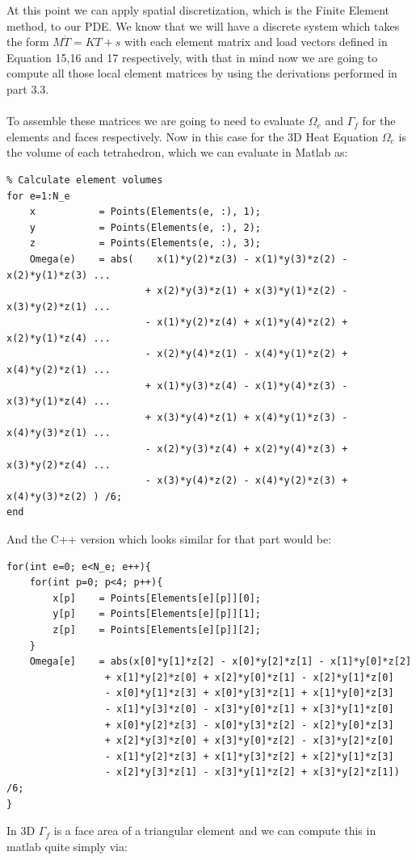 \documentclass[12pt]{article}
\begin{document}
At this point we can apply spatial discretization, which is the Finite Element method, to our PDE. We know that we will have a discrete system which takes the form $M\dot{T} = KT + s$ with each element matrix and load vectors defined in Equation 15,16 and 17 respectively, with that in mind now we are going to compute all those local element matrices by using the derivations performed in part 3.3.
\\\\
To assemble these matrices we are going to need to evaluate $\Omega_e$ and $\Gamma_f$ for the elements and faces respectively. Now in this case for the 3D Heat Equation $\Omega_e$ is the volume of each tetrahedron, which we can evaluate in Matlab as:

\begin{lstlisting}
% Calculate element volumes
for e=1:N_e	
	x           = Points(Elements(e, :), 1);
	y           = Points(Elements(e, :), 2);
	z           = Points(Elements(e, :), 3);
	Omega(e)	= abs(    x(1)*y(2)*z(3) - x(1)*y(3)*z(2) - x(2)*y(1)*z(3) ...
						+ x(2)*y(3)*z(1) + x(3)*y(1)*z(2) - x(3)*y(2)*z(1) ...
						- x(1)*y(2)*z(4) + x(1)*y(4)*z(2) + x(2)*y(1)*z(4) ...
						- x(2)*y(4)*z(1) - x(4)*y(1)*z(2) + x(4)*y(2)*z(1) ...
						+ x(1)*y(3)*z(4) - x(1)*y(4)*z(3) - x(3)*y(1)*z(4) ...
						+ x(3)*y(4)*z(1) + x(4)*y(1)*z(3) - x(4)*y(3)*z(1) ...
						- x(2)*y(3)*z(4) + x(2)*y(4)*z(3) + x(3)*y(2)*z(4) ...
						- x(3)*y(4)*z(2) - x(4)*y(2)*z(3) + x(4)*y(3)*z(2) ) /6;
end
\end{lstlisting}

And the C++ version which looks similar for that part would be:

\begin{lstlisting}[style=MyC++Style]
for(int e=0; e<N_e; e++){
	for(int p=0; p<4; p++){
		x[p]	= Points[Elements[e][p]][0];
		y[p]	= Points[Elements[e][p]][1];
		z[p]	= Points[Elements[e][p]][2];
	}
	Omega[e]    = abs(x[0]*y[1]*z[2] - x[0]*y[2]*z[1] - x[1]*y[0]*z[2]
				 + x[1]*y[2]*z[0] + x[2]*y[0]*z[1] - x[2]*y[1]*z[0]
				 - x[0]*y[1]*z[3] + x[0]*y[3]*z[1] + x[1]*y[0]*z[3]
				 - x[1]*y[3]*z[0] - x[3]*y[0]*z[1] + x[3]*y[1]*z[0]
				 + x[0]*y[2]*z[3] - x[0]*y[3]*z[2] - x[2]*y[0]*z[3]
				 + x[2]*y[3]*z[0] + x[3]*y[0]*z[2] - x[3]*y[2]*z[0]
				 - x[1]*y[2]*z[3] + x[1]*y[3]*z[2] + x[2]*y[1]*z[3]
				 - x[2]*y[3]*z[1] - x[3]*y[1]*z[2] + x[3]*y[2]*z[1]) /6;
}
\end{lstlisting}

In 3D $\Gamma_f$ is a face area of a triangular element and we can compute this in matlab quite simply via:
\end{document}
